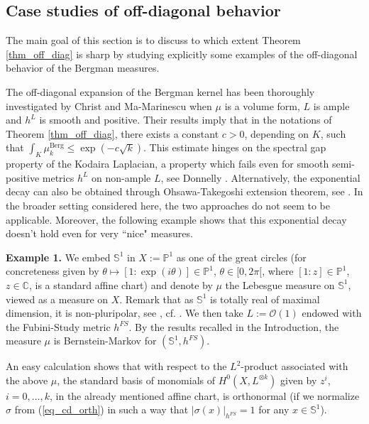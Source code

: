\documentclass[12pt]{article}
\numberwithin{equation}{section}
\theoremstyle{theorem}
\theoremstyle{definition}
\theoremstyle{remark}
\newcommand{\comp}{\mathbb{C}}
\begin{document}
	\subsection{Case studies of off-diagonal behavior}\label{sect_exampl}
	The main goal of this section is to discuss to which extent Theorem \ref{thm_off_diag} is sharp by studying explicitly  some examples of the off-diagonal behavior of the Bergman measures.
	\par 
	The off-diagonal expansion of the Bergman kernel has been thoroughly investigated by Christ \cite{ChristBergmanOff} and Ma-Marinescu \cite{MaMarOffDiag} when $\mu$ is a volume form, $L$ is ample and $h^L$ is smooth and positive.
	Their results imply that in the notations of Theorem \ref{thm_off_diag}, there exists a constant $c > 0$, depending on $K$, such that $\int_{K} \mu_k^{\mathrm{Berg}} \leq \exp(-c \sqrt{k})$.
	This estimate hinges on the spectral gap property of the Kodaira Laplacian, a property which fails even for smooth semi-positive metrics $h^L$ on non-ample $L$, see Donnelly \cite{DonnellyGap}. 
	Alternatively, the exponential decay can also be obtained through Ohsawa-Takegoshi extension theorem, see \cite[Theorem 1.3]{BermanBulkUniv}.
	In the broader setting considered here, the two approaches do not seem to be applicable.
	Moreover, the following example shows that this exponential decay doesn't hold even for very “nice" measures.
	\par 
	\textbf{Example 1.}
	We embed $\mathbb{S}^1$ in $X := \mathbb{P}^1$ as one of the great circles (for concreteness given by $\theta \mapsto [1: \exp(i \theta)] \in \mathbb{P}^1$, $\theta \in [0, 2 \pi[$, where $[1 : z] \in \mathbb{P}^1$, $z \in \comp$, is a standard affine chart) and denote by $\mu$ the Lebesgue measure on $\mathbb{S}^1$, viewed as a measure on $X$.
	Remark that as $\mathbb{S}^1$ is totally real of maximal dimension, it is non-pluripolar, see \cite{SadullaevReal}, cf. \cite[Exercise 4.39.5]{GuedjZeriahBook}. 
	We then take $L := \mathscr{O}(1)$ endowed with the Fubini-Study metric $h^{FS}$.
	By the results recalled in the Introduction, the measure $\mu$ is Bernstein-Markov for $(\mathbb{S}^1, h^{FS})$. 
	\par 
	An easy calculation shows that with respect to the $L^2$-product associated with the above $\mu$, the standard basis of monomials of $H^0(X, L^{\otimes k})$ given by $z^i$, $i = 0, \ldots, k$, in the already mentioned affine chart, is orthonormal (if we normalize $\sigma$ from (\ref{eq_cd_orth}) in such a way that $|\sigma(x)|_{h^{FS}} = 1$ for any $x \in \mathbb{S}^1$).
\end{document}
